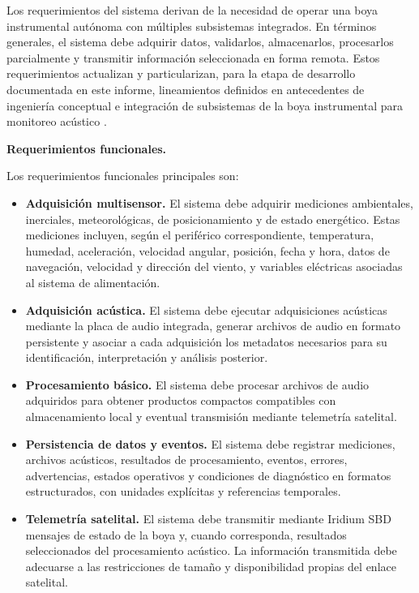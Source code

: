 Los requerimientos del sistema derivan de la necesidad de operar una boya instrumental autónoma con múltiples subsistemas integrados. En términos generales, el sistema debe adquirir datos, validarlos, almacenarlos, procesarlos parcialmente y transmitir información seleccionada en forma remota. Estos requerimientos actualizan y particularizan, para la etapa de desarrollo documentada en este informe, lineamientos definidos en antecedentes de ingeniería conceptual e integración de subsistemas de la boya instrumental para monitoreo acústico \citep{AS0316_BoyaConceptual,AS0219_Subsistemas}.

\noindent\textbf{Requerimientos funcionales.}

Los requerimientos funcionales principales son:

\begin{itemize}
    \item \textbf{Adquisición multisensor.} El sistema debe adquirir mediciones ambientales, inerciales, meteorológicas, de posicionamiento y de estado energético. Estas mediciones incluyen, según el periférico correspondiente, temperatura, humedad, aceleración, velocidad angular, posición, fecha y hora, datos de navegación, velocidad y dirección del viento, y variables eléctricas asociadas al sistema de alimentación.

    \item \textbf{Adquisición acústica.} El sistema debe ejecutar adquisiciones acústicas mediante la placa de audio integrada, generar archivos de audio en formato persistente y asociar a cada adquisición los metadatos necesarios para su identificación, interpretación y análisis posterior.

    \item \textbf{Procesamiento básico.} El sistema debe procesar archivos de audio adquiridos para obtener productos compactos compatibles con almacenamiento local y eventual transmisión mediante telemetría satelital.

    \item \textbf{Persistencia de datos y eventos.} El sistema debe registrar mediciones, archivos acústicos, resultados de procesamiento, eventos, errores, advertencias, estados operativos y condiciones de diagnóstico en formatos estructurados, con unidades explícitas y referencias temporales.

    \item \textbf{Telemetría satelital.} El sistema debe transmitir mediante Iridium SBD mensajes de estado de la boya y, cuando corresponda, resultados seleccionados del procesamiento acústico. La información transmitida debe adecuarse a las restricciones de tamaño y disponibilidad propias del enlace satelital.


\end{itemize}
